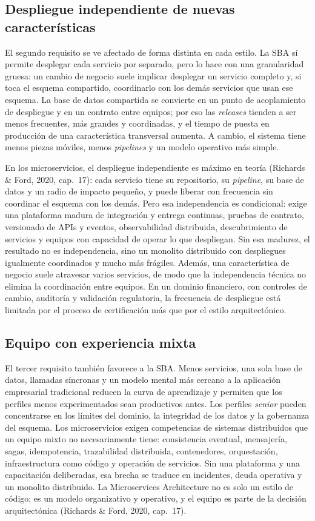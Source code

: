 \documentclass[12pt,a4paper]{article}
\begin{document}
\subsection{Despliegue independiente de nuevas características}

El segundo requisito se ve afectado de forma distinta en cada estilo. La SBA sí permite desplegar cada servicio por separado, pero lo hace con una granularidad gruesa: un cambio de negocio suele implicar desplegar un servicio completo y, si toca el esquema compartido, coordinarlo con los demás servicios que usan ese esquema. La base de datos compartida se convierte en un punto de acoplamiento de despliegue y en un contrato entre equipos; por eso las \emph{releases} tienden a ser menos frecuentes, más grandes y coordinadas, y el tiempo de puesta en producción de una característica transversal aumenta. A cambio, el sistema tiene menos piezas móviles, menos \emph{pipelines} y un modelo operativo más simple.

En los microservicios, el despliegue independiente es máximo en teoría (Richards \& Ford, 2020, cap.~17): cada servicio tiene su repositorio, su \emph{pipeline}, su base de datos y un radio de impacto pequeño, y puede liberar con frecuencia sin coordinar el esquema con los demás. Pero esa independencia es condicional: exige una plataforma madura de integración y entrega continuas, pruebas de contrato, versionado de APIs y eventos, observabilidad distribuida, descubrimiento de servicios y equipos con capacidad de operar lo que despliegan. Sin esa madurez, el resultado no es independencia, sino un monolito distribuido con despliegues igualmente coordinados y mucho más frágiles. Además, una característica de negocio suele atravesar varios servicios, de modo que la independencia técnica no elimina la coordinación entre equipos. En un dominio financiero, con controles de cambio, auditoría y validación regulatoria, la frecuencia de despliegue está limitada por el proceso de certificación más que por el estilo arquitectónico.

\subsection{Equipo con experiencia mixta}

El tercer requisito también favorece a la SBA. Menos servicios, una sola base de datos, llamadas síncronas y un modelo mental más cercano a la aplicación empresarial tradicional reducen la curva de aprendizaje y permiten que los perfiles menos experimentados sean productivos antes. Los perfiles \emph{senior} pueden concentrarse en los límites del dominio, la integridad de los datos y la gobernanza del esquema. Los microservicios exigen competencias de sistemas distribuidos que un equipo mixto no necesariamente tiene: consistencia eventual, mensajería, sagas, idempotencia, trazabilidad distribuida, contenedores, orquestación, infraestructura como código y operación de servicios. Sin una plataforma y una capacitación deliberadas, esa brecha se traduce en incidentes, deuda operativa y un monolito distribuido. La Microservices Architecture no es solo un estilo de código; es un modelo organizativo y operativo, y el equipo es parte de la decisión arquitectónica (Richards \& Ford, 2020, cap.~17).
\end{document}
